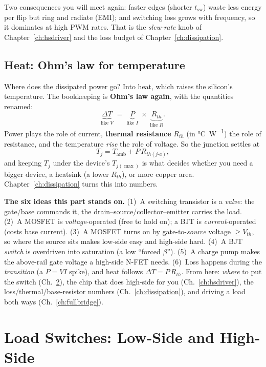\documentclass[11pt,a4paper,oneside]{book}
\begin{document}
\noindent Two consequences you will meet again: faster edges (shorter $t_{\text{sw}}$) waste
less energy per flip but ring and radiate (EMI); and switching loss grows with frequency,
so it dominates at high PWM rates. That is the \emph{slew-rate} knob of
Chapter~\ref{ch:hsdriver} and the loss budget of Chapter~\ref{ch:dissipation}.

\section{Heat: Ohm's law for temperature}
Where does the dissipated power go? Into heat, which raises the silicon's temperature. The
bookkeeping is \textbf{Ohm's law again}, with the quantities renamed:
\[
  \underbrace{\Delta T}_{\text{like }V}
  \;=\;
  \underbrace{P}_{\text{like }I}
  \;\times\;
  \underbrace{R_{th}}_{\text{like }R}.
\]
Power plays the role of current, \textbf{thermal resistance} $R_{th}$ (in
\unit{\celsius\per\watt}) the role of resistance, and the temperature \emph{rise} the role
of voltage. So the junction settles at
\[
  T_j = T_{\text{amb}} + P\,R_{th(j\text{-}a)},
\]
and keeping $T_j$ under the device's $T_{j(\max)}$ is what decides whether you need a bigger
device, a heatsink (a lower $R_{th}$), or more copper area. Chapter~\ref{ch:dissipation}
turns this into numbers.

\begin{keyidea}
\textbf{The six ideas this part stands on.} (1)~A switching transistor is a \emph{valve}:
the gate/base commands it, the drain--source/collector--emitter carries the load.
(2)~A MOSFET is \emph{voltage}-operated (free to hold on); a BJT is \emph{current}-operated
(costs base current). (3)~A MOSFET turns on by gate-to-\emph{source} voltage $\ge V_{th}$,
so where the source sits makes low-side easy and high-side hard. (4)~A BJT \emph{switch} is
overdriven into saturation (a low ``forced $\beta$''). (5)~A charge pump makes the
above-rail gate voltage a high-side N-FET needs. (6)~Loss happens during the
\emph{transition} (a $P=VI$ spike), and heat follows $\Delta T=P\,R_{th}$. From here:
\emph{where} to put the switch (Ch.~\ref{ch:switches}), the chip that does high-side for you
(Ch.~\ref{ch:hsdriver}), the loss/thermal/base-resistor numbers (Ch.~\ref{ch:dissipation}),
and driving a load both ways (Ch.~\ref{ch:fullbridge}).
\end{keyidea}

\chapter{Load Switches: Low-Side and High-Side}
\label{ch:switches}
\end{document}
